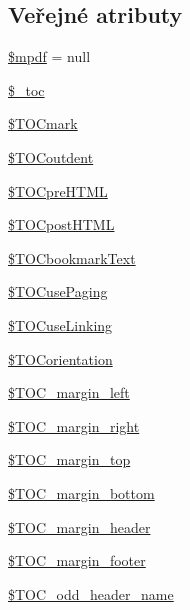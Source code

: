 \subsection*{Veřejné atributy}
\begin{DoxyCompactItemize}
\item 
\hyperlink{classtocontents_aabe78e68164daa6df85eb40e515c92bc}{\$mpdf} = null
\item 
\hyperlink{classtocontents_accb361b9a0daf782c595cef220109c53}{\$\-\_\-toc}
\item 
\hyperlink{classtocontents_a6900c91b59630da4498b7eab607418e8}{\$\-T\-O\-Cmark}
\item 
\hyperlink{classtocontents_a9ad26e5b1353a538a7ed33b2b1b2b81a}{\$\-T\-O\-Coutdent}
\item 
\hyperlink{classtocontents_a4ae235667ddb9615e50edc6b2ea7528c}{\$\-T\-O\-Cpre\-H\-T\-M\-L}
\item 
\hyperlink{classtocontents_a8cc007390c83ba8118f703a22873ba61}{\$\-T\-O\-Cpost\-H\-T\-M\-L}
\item 
\hyperlink{classtocontents_a2191c0d9ec2b06d9343ff08267adfeca}{\$\-T\-O\-Cbookmark\-Text}
\item 
\hyperlink{classtocontents_ac8c5f167244c0d7137eddee1803596ff}{\$\-T\-O\-Cuse\-Paging}
\item 
\hyperlink{classtocontents_a8fad1b522141a49147c2a3f503a76715}{\$\-T\-O\-Cuse\-Linking}
\item 
\hyperlink{classtocontents_a24c30d79aaa9a509776ae1ac072d8fa3}{\$\-T\-O\-Corientation}
\item 
\hyperlink{classtocontents_a593bc1f34481babc3d7395d409f8b665}{\$\-T\-O\-C\-\_\-margin\-\_\-left}
\item 
\hyperlink{classtocontents_a43884998e681e29be2be505fe1b3e7a4}{\$\-T\-O\-C\-\_\-margin\-\_\-right}
\item 
\hyperlink{classtocontents_ad31c869d2688731c3aad246aded2d761}{\$\-T\-O\-C\-\_\-margin\-\_\-top}
\item 
\hyperlink{classtocontents_a58abc5718a6515b4a19f3a6ca724efaf}{\$\-T\-O\-C\-\_\-margin\-\_\-bottom}
\item 
\hyperlink{classtocontents_ae6c21d48a5d4bd8c69ea5c62ce43704e}{\$\-T\-O\-C\-\_\-margin\-\_\-header}
\item 
\hyperlink{classtocontents_a5f6ed9da7d556cd1a7ceca6da2229110}{\$\-T\-O\-C\-\_\-margin\-\_\-footer}
\item 
\hyperlink{classtocontents_a655d9e3d8a01e4208758d164c5ac6435}{\$\-T\-O\-C\-\_\-odd\-\_\-header\-\_\-name}
\item 

\end{DoxyCompactItemize}
